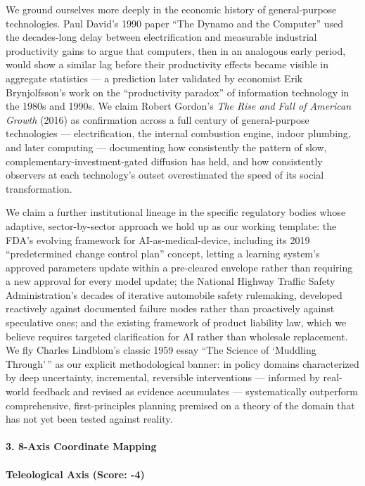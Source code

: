 We ground ourselves more deeply in the economic history of
general-purpose technologies. Paul David's 1990 paper ``The Dynamo and
the Computer'' used the decades-long delay between electrification and
measurable industrial productivity gains to argue that computers, then
in an analogous early period, would show a similar lag before their
productivity effects became visible in aggregate statistics --- a
prediction later validated by economist Erik Brynjolfsson's work on the
``productivity paradox'' of information technology in the 1980s and
1990s. We claim Robert Gordon's \emph{The Rise and Fall of American
Growth} (2016) as confirmation across a full century of general-purpose
technologies --- electrification, the internal combustion engine, indoor
plumbing, and later computing --- documenting how consistently the
pattern of slow, complementary-investment-gated diffusion has held, and
how consistently observers at each technology's outset overestimated the
speed of its social transformation.

We claim a further institutional lineage in the specific regulatory
bodies whose adaptive, sector-by-sector approach we hold up as our
working template: the FDA's evolving framework for AI-as-medical-device,
including its 2019 ``predetermined change control plan'' concept,
letting a learning system's approved parameters update within a
pre-cleared envelope rather than requiring a new approval for every
model update; the National Highway Traffic Safety Administration's
decades of iterative automobile safety rulemaking, developed reactively
against documented failure modes rather than proactively against
speculative ones; and the existing framework of product liability law,
which we believe requires targeted clarification for AI rather than
wholesale replacement. We fly Charles Lindblom's classic 1959 essay
``The Science of `Muddling Through'\,'' as our explicit methodological
banner: in policy domains characterized by deep uncertainty,
incremental, reversible interventions --- informed by real-world
feedback and revised as evidence accumulates --- systematically
outperform comprehensive, first-principles planning premised on a theory
of the domain that has not yet been tested against reality.

\paragraph{3. 8-Axis Coordinate
Mapping}\label{axis-coordinate-mapping-20}

\paragraph{Teleological Axis (Score:
-4)}\label{teleological-axis-score--4}

